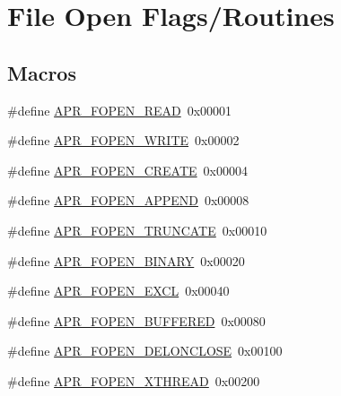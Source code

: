 \hypertarget{group__apr__file__open__flags}{\section{File Open Flags/\-Routines}
\label{group__apr__file__open__flags}
}
\subsection*{Macros}
\begin{DoxyCompactItemize}
\item 
\#define \hyperlink{group__apr__file__open__flags_gaf9e7303f028b130ff7d4b209d6662d7d}{A\-P\-R\-\_\-\-F\-O\-P\-E\-N\-\_\-\-R\-E\-A\-D}~0x00001
\item 
\#define \hyperlink{group__apr__file__open__flags_gac598bb95fc9476b0bf2ed0b1c308842c}{A\-P\-R\-\_\-\-F\-O\-P\-E\-N\-\_\-\-W\-R\-I\-T\-E}~0x00002
\item 
\#define \hyperlink{group__apr__file__open__flags_gafe94f21ccbf411172e70e7f473af251a}{A\-P\-R\-\_\-\-F\-O\-P\-E\-N\-\_\-\-C\-R\-E\-A\-T\-E}~0x00004
\item 
\#define \hyperlink{group__apr__file__open__flags_ga45f353db9b71d4760a3f35cf3781cfc8}{A\-P\-R\-\_\-\-F\-O\-P\-E\-N\-\_\-\-A\-P\-P\-E\-N\-D}~0x00008
\item 
\#define \hyperlink{group__apr__file__open__flags_ga09b05a5bd5db534b93794f7657bcb146}{A\-P\-R\-\_\-\-F\-O\-P\-E\-N\-\_\-\-T\-R\-U\-N\-C\-A\-T\-E}~0x00010
\item 
\#define \hyperlink{group__apr__file__open__flags_gacb20b3028864f34cb26314fe2cacc3fa}{A\-P\-R\-\_\-\-F\-O\-P\-E\-N\-\_\-\-B\-I\-N\-A\-R\-Y}~0x00020
\item 
\#define \hyperlink{group__apr__file__open__flags_gabb7fb062cdf1d58faee8c7ea518496f1}{A\-P\-R\-\_\-\-F\-O\-P\-E\-N\-\_\-\-E\-X\-C\-L}~0x00040
\item 
\#define \hyperlink{group__apr__file__open__flags_gac48fd4c853c9f561632a2e8aaf5d8d97}{A\-P\-R\-\_\-\-F\-O\-P\-E\-N\-\_\-\-B\-U\-F\-F\-E\-R\-E\-D}~0x00080
\item 
\#define \hyperlink{group__apr__file__open__flags_ga5d3756f6d242c667ed1d3f54af4916eb}{A\-P\-R\-\_\-\-F\-O\-P\-E\-N\-\_\-\-D\-E\-L\-O\-N\-C\-L\-O\-S\-E}~0x00100
\item 
\#define \hyperlink{group__apr__file__open__flags_ga435cd9b2604b11796779c23ffa00a3dd}{A\-P\-R\-\_\-\-F\-O\-P\-E\-N\-\_\-\-X\-T\-H\-R\-E\-A\-D}~0x00200
\item 

\end{DoxyCompactItemize}
